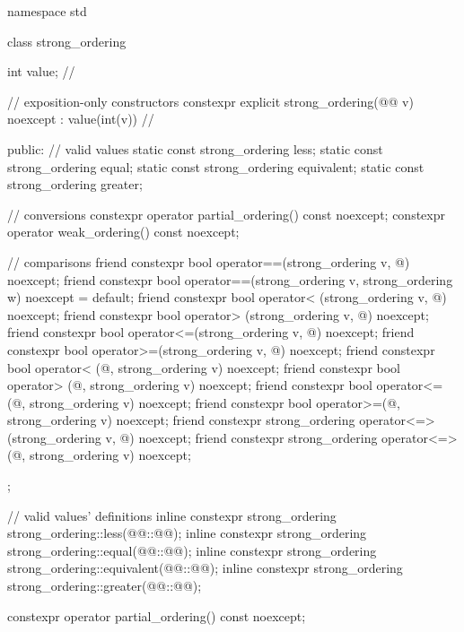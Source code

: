 %
%
%
%
%
\begin{codeblock}
namespace std {
  class strong_ordering {
    int value;  // \expos

    // exposition-only constructors
    constexpr explicit strong_ordering(@@ v) noexcept : value(int(v)) {}   // \expos

  public:
    // valid values
    static const strong_ordering less;
    static const strong_ordering equal;
    static const strong_ordering equivalent;
    static const strong_ordering greater;

    // conversions
    constexpr operator partial_ordering() const noexcept;
    constexpr operator weak_ordering() const noexcept;

    // comparisons
    friend constexpr bool operator==(strong_ordering v, @\unspec@) noexcept;
    friend constexpr bool operator==(strong_ordering v, strong_ordering w) noexcept = default;
    friend constexpr bool operator< (strong_ordering v, @\unspec@) noexcept;
    friend constexpr bool operator> (strong_ordering v, @\unspec@) noexcept;
    friend constexpr bool operator<=(strong_ordering v, @\unspec@) noexcept;
    friend constexpr bool operator>=(strong_ordering v, @\unspec@) noexcept;
    friend constexpr bool operator< (@\unspec@, strong_ordering v) noexcept;
    friend constexpr bool operator> (@\unspec@, strong_ordering v) noexcept;
    friend constexpr bool operator<=(@\unspec@, strong_ordering v) noexcept;
    friend constexpr bool operator>=(@\unspec@, strong_ordering v) noexcept;
    friend constexpr strong_ordering operator<=>(strong_ordering v, @\unspec@) noexcept;
    friend constexpr strong_ordering operator<=>(@\unspec@, strong_ordering v) noexcept;
  };

  // valid values' definitions
  inline constexpr strong_ordering strong_ordering::less(@@::@@);
  inline constexpr strong_ordering strong_ordering::equal(@@::@@);
  inline constexpr strong_ordering strong_ordering::equivalent(@@::@@);
  inline constexpr strong_ordering strong_ordering::greater(@@::@@);
}
\end{codeblock}

%
\begin{itemdecl}
constexpr operator partial_ordering() const noexcept;
\end{itemdecl}

